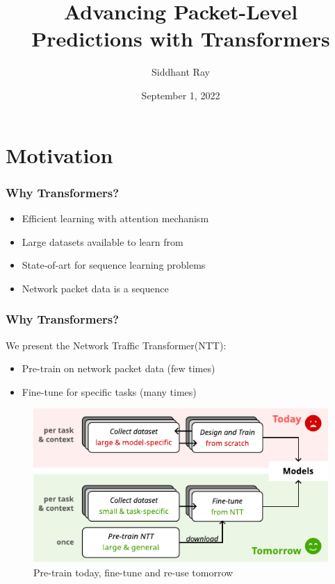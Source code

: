\documentclass{beamer}
\title[Master Thesis] %
{Advancing Packet-Level Predictions with Transformers}
\date{September 1, 2022}
\author[Siddhant Ray] %
{Siddhant Ray}
\institute[ETH Zürich] %
{
  Dept. of Information Technology and Electrical Engineering(D-ITET) \\
  ETH Zürich
}
\begin{document}
\frame{\titlepage}


%


\section{Motivation}

\begin{frame}
\frametitle{Why Transformers?}

\begin{itemize}
    \item<1-> Efficient learning with attention mechanism
    \item<1-> Large datasets available to learn from
    \item<2-> State-of-art for sequence learning problems
     \item<2-> Network packet data is a sequence
\end{itemize}
\end{frame}

\begin{frame}
\frametitle{Why Transformers?}

We present the Network Traffic Transformer(NTT):
\pause

 \begin{itemize}  
    \item<1-> Pre-train on network packet data (few times)
    \item<1-> Fine-tune for specific tasks (many times)
\end{itemize}
\pause

\begin{figure}[!hbt]
  \begin{center}
    \includegraphics[scale=0.8]{figures/vision.pdf}
    \caption{Pre-train today, fine-tune and re-use tomorrow}
    \label{fig:vision}
  \end{center}
\end{figure}
    
    
\end{frame}
\end{document}
